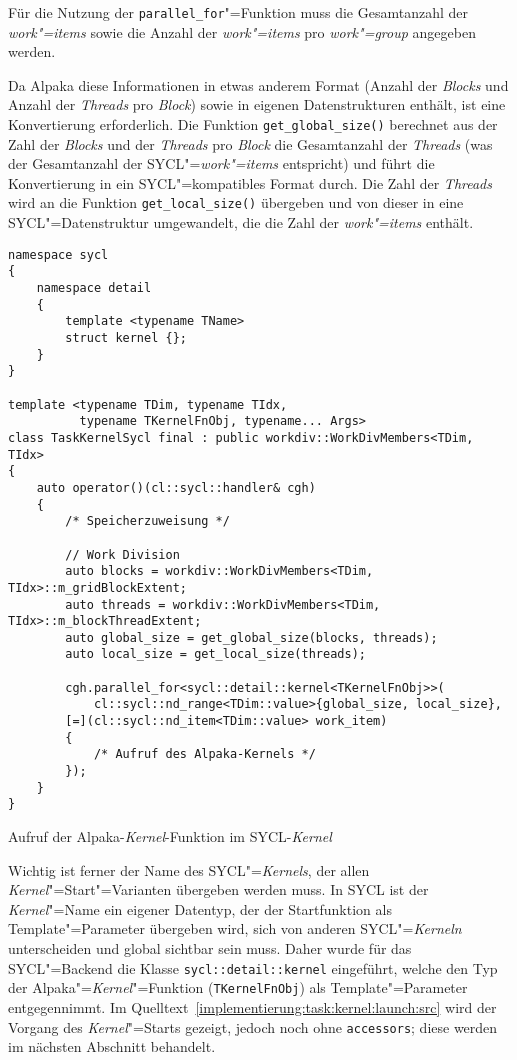 Für die Nutzung der \texttt{parallel\_for}"=Funktion muss die Gesamtanzahl der
\textit{work"=items} sowie die Anzahl der \textit{work"=items} pro
\textit{work"=group} angegeben werden.

Da Alpaka diese Informationen in etwas anderem Format (Anzahl der
\textit{Blocks} und Anzahl der \textit{Threads} pro \textit{Block}) sowie in
eigenen Datenstrukturen enthält, ist eine Konvertierung erforderlich. Die
Funktion \texttt{get\_global\_size()} berechnet aus der Zahl der \textit{Blocks}
und der \textit{Threads} pro \textit{Block} die Gesamtanzahl der
\textit{Threads} (was der Gesamtanzahl der SYCL"=\textit{work"=items}
entspricht) und führt die Konvertierung in ein SYCL"=kompatibles Format durch.
Die Zahl der \textit{Threads} wird an die Funktion \texttt{get\_local\_size()}
übergeben und von dieser in eine SYCL"=Datenstruktur umgewandelt, die die Zahl
der \textit{work"=items} enthält.

\begin{code}
    \begin{verbatim}
namespace sycl
{
    namespace detail
    {
        template <typename TName>
        struct kernel {};
    }
}

template <typename TDim, typename TIdx,
          typename TKernelFnObj, typename... Args>
class TaskKernelSycl final : public workdiv::WorkDivMembers<TDim, TIdx>
{
    auto operator()(cl::sycl::handler& cgh)
    {
        /* Speicherzuweisung */

        // Work Division
        auto blocks = workdiv::WorkDivMembers<TDim, TIdx>::m_gridBlockExtent;
        auto threads = workdiv::WorkDivMembers<TDim, TIdx>::m_blockThreadExtent;
        auto global_size = get_global_size(blocks, threads);
        auto local_size = get_local_size(threads);

        cgh.parallel_for<sycl::detail::kernel<TKernelFnObj>>(
            cl::sycl::nd_range<TDim::value>{global_size, local_size},
        [=](cl::sycl::nd_item<TDim::value> work_item)
        {
            /* Aufruf des Alpaka-Kernels */
        });
    }
}
    \end{verbatim}
    \caption{Aufruf der Alpaka-\textit{Kernel}-Funktion im SYCL-\textit{Kernel}}
    \label{implementierung:task:kernel:launch:src}
\end{code}
\vspace{3mm}
Wichtig ist ferner der Name des SYCL"=\textit{Kernels}, der allen
\textit{Kernel}"=Start"=Varianten übergeben werden muss. In SYCL ist der
\textit{Kernel}"=Name ein eigener Datentyp, der der Startfunktion als
Template"=Parameter übergeben wird, sich von anderen SYCL"=\textit{Kerneln}
unterscheiden und global sichtbar sein muss. Daher wurde für das SYCL"=Backend
die Klasse \texttt{sycl::detail::kernel} eingeführt, welche den Typ der
Alpaka"=\textit{Kernel}"=Funktion (\texttt{TKernelFnObj}) als
Template"=Parameter entgegennimmt. Im
Quelltext~\ref{implementierung:task:kernel:launch:src} wird der Vorgang des
\textit{Kernel}"=Starts gezeigt, jedoch noch ohne \texttt{accessors}; diese
werden im nächsten Abschnitt behandelt.

